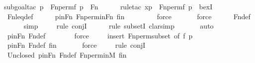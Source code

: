 \begin{isabellebody}
{\isacharparenleft}{\kern0pt}subgoal{\isacharunderscore}{\kern0pt}tac\ {\isachardoublequoteopen}p\ {\isasymunion}\ Fn{\isacharunderscore}{\kern0pt}perm{\isacharparenleft}{\kern0pt}f{\isacharcomma}{\kern0pt}\ p{\isacharparenright}{\kern0pt}\ {\isasymin}\ Fn{\isachardoublequoteclose}{\isacharparenright}{\kern0pt}\isanewline
\ \ \ \ \ \isamarkupfalse%
{\isacharparenleft}{\kern0pt}rule{\isacharunderscore}{\kern0pt}tac\ x{\isacharequal}{\kern0pt}{\isachardoublequoteopen}p\ {\isasymunion}\ Fn{\isacharunderscore}{\kern0pt}perm{\isacharparenleft}{\kern0pt}f{\isacharcomma}{\kern0pt}\ p{\isacharparenright}{\kern0pt}{\isachardoublequoteclose}\ \ bexI{\isacharparenright}{\kern0pt}\isanewline
\ \ \ \ \isamarkupfalse%
\ Fn{\isacharunderscore}{\kern0pt}leq{\isacharunderscore}{\kern0pt}def\isanewline
\ \ \ \ \isamarkupfalse%
\ pinFn\ Fn{\isacharunderscore}{\kern0pt}perm{\isacharunderscore}{\kern0pt}in{\isacharunderscore}{\kern0pt}Fn\ fin\ \isanewline
\ \ \ \ \ \ \isamarkupfalse%
\ force\isanewline
\ \ \ \ \ \isamarkupfalse%
\ force\isanewline
\ \ \ \ \isamarkupfalse%
\ Fn{\isacharunderscore}{\kern0pt}def\ \isanewline
\ \ \ \ \isamarkupfalse%
\ simp\isanewline
\ \ \ \ \isamarkupfalse%
{\isacharparenleft}{\kern0pt}rule\ conjI{\isacharparenright}{\kern0pt}\isanewline
\ \ \ \ \ \isamarkupfalse%
{\isacharparenleft}{\kern0pt}rule\ subsetI{\isacharcomma}{\kern0pt}\ clarsimp{\isacharparenright}{\kern0pt}\isanewline
\ \ \ \ \ \isamarkupfalse%
\ auto{\isacharbrackleft}{\kern0pt}{}{\isacharbrackright}{\kern0pt}\isanewline
\ \ \ \ \isamarkupfalse%
\ pinFn\ Fn{\isacharunderscore}{\kern0pt}def\isanewline
\ \ \ \ \ \ \isamarkupfalse%
\ force\isanewline
\ \ \ \ \isamarkupfalse%
{\isacharparenleft}{\kern0pt}insert\ Fn{\isacharunderscore}{\kern0pt}perm{\isacharunderscore}{\kern0pt}subset\ {\isacharbrackleft}{\kern0pt}of\ f\ p{\isacharbrackright}{\kern0pt}{\isacharparenright}{\kern0pt}\isanewline
\ \ \ \ \isamarkupfalse%
\ pinFn\ Fn{\isacharunderscore}{\kern0pt}def\ fin\isanewline
\ \ \ \ \ \isamarkupfalse%
\ force\isanewline
\ \ \ \ \isamarkupfalse%
{\isacharparenleft}{\kern0pt}rule\ conjI{\isacharparenright}{\kern0pt}\isanewline
\ \ \ \ \isamarkupfalse%
\ Un{\isacharunderscore}{\kern0pt}closed\ pinFn\ Fn{\isacharunderscore}{\kern0pt}def\ Fn{\isacharunderscore}{\kern0pt}perm{\isacharunderscore}{\kern0pt}in{\isacharunderscore}{\kern0pt}M\ fin\ \isanewline

\end{isabellebody}
